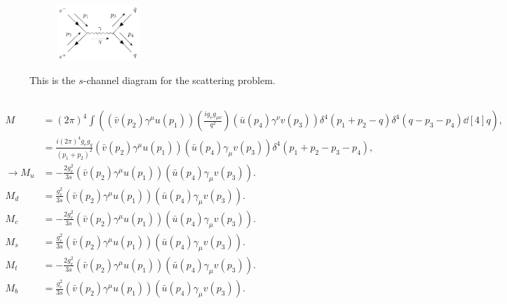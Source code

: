 \documentclass[
a4paper,
10pt,
twoside,
prd,
aps,
nofootinbib,
superscriptaddress,
floatfix,
preprintnumbers,
]{article}
\begin{document}
\titleinf
\maketitle \startmcols

\section{}
\subsection{}
\begin{figure}[H]
	\centering
	\begin{subfigure}[a]{\linewidth}
		\centering
		\includegraphics[width=0.3375\textwidth]{figures/prob1Diag.pdf}
	\end{subfigure}
	\caption{This is the $s$-channel diagram for the scattering problem.}
	\label{fig: 4_1}
\end{figure}

\subsection{}
\begin{align}
    M &= (2\pi)^4 \int \left( (\bar{v}(p_2)\gamma^\mu u(p_1)) \left(\frac{ig_e g_{\mu\nu}}{q^2}\right)(\bar{u}(p_4)\gamma^\nu v(p_3)) \delta^4(p_1+p_2-q)\delta^4(q-p_3-p_4) \dd[4]q\right),\\
    &=  \frac{i(2\pi)^4g_eg_q}{(p_1+p_2)^2} (\bar{v}(p_2)\gamma^\mu u(p_1))(\bar{u}(p_4)\gamma_\mu v(p_3)) \delta^4(p_1+p_2-p_3-p_4),\\
    \rightarrow
    M_u &= -\frac{2g_e^2}{3s} (\bar{v}(p_2)\gamma^\mu u(p_1))(\bar{u}(p_4)\gamma_\mu v(p_3)).
    \label{eq : 1b_ans_u}\\
    M_d &= \frac{g_e^2}{3s} (\bar{v}(p_2)\gamma^\mu u(p_1))(\bar{u}(p_4)\gamma_\mu v(p_3)).
    \label{eq : 1b_ans_d}\\
    M_c &= -\frac{2g_e^2}{3s} (\bar{v}(p_2)\gamma^\mu u(p_1))(\bar{u}(p_4)\gamma_\mu v(p_3)).
    \label{eq : 1b_ans_c}\\
    M_s &= \frac{g_e^2}{3s} (\bar{v}(p_2)\gamma^\mu u(p_1))(\bar{u}(p_4)\gamma_\mu v(p_3)).
    \label{eq : 1b_ans_s}\\
    M_t &= -\frac{2g_e^2}{3s} (\bar{v}(p_2)\gamma^\mu u(p_1))(\bar{u}(p_4)\gamma_\mu v(p_3)).
    \label{eq : 1b_ans_t}\\
    M_b &= \frac{g_e^2}{3s} (\bar{v}(p_2)\gamma^\mu u(p_1))(\bar{u}(p_4)\gamma_\mu v(p_3)).
    \label{eq : 1b_ans_b}
\end{align}
\end{document}
